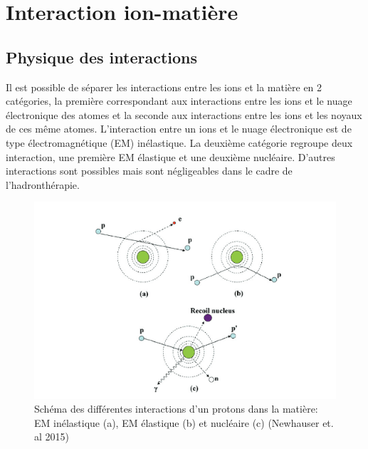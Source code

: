 \documentclass[11pt,a4paper,oldfontcommands]{memoir}
\begin{document}
\section{Interaction ion-matière}
\subsection{Physique des interactions}

Il est possible de séparer les interactions entre les ions et la matière en 2 catégories, la première correspondant aux interactions entre les ions et le nuage électronique des atomes et la seconde aux interactions entre les ions et les noyaux de ces même atomes. L'interaction entre un ions et le nuage électronique est de type électromagnétique (EM) inélastique. La deuxième catégorie regroupe deux interaction, une première EM élastique et une deuxième nucléaire. D'autres interactions sont possibles mais sont négligeables dans le cadre de l'hadronthérapie.\\
\begin{figure}[h!]
    \centering
    \includegraphics{intro/Newhauser2015.PNG}
    \caption{Schéma des différentes interactions d'un protons dans la matière: EM inélastique (a), EM élastique (b) et nucléaire (c) (Newhauser et. al 2015)}
    \label{fig:my_label}
\end{figure}
\end{document}
